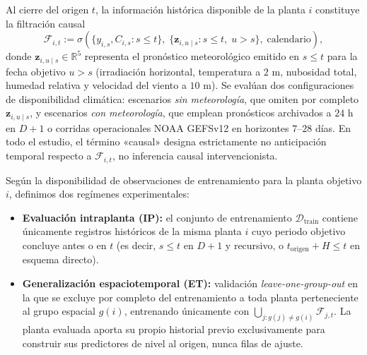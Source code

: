 Al cierre del origen $t$, la información histórica disponible de la planta $i$ constituye la filtración causal
\begin{equation}
\mathcal{F}_{i,t} := \sigma\!\left(\{y_{i,s}, C_{i,s} : s \le t\},\; \{\mathbf{z}_{i,u \mid s} : s \le t,\; u > s\},\; \text{calendario}\right),
\end{equation}
donde $\mathbf{z}_{i,u \mid s} \in \mathbb{R}^5$ representa el pronóstico meteorológico emitido en $s \le t$ para la fecha objetivo $u > s$ (irradiación horizontal, temperatura a $2\text{ m}$, nubosidad total, humedad relativa y velocidad del viento a $10\text{ m}$). Se evalúan dos configuraciones de disponibilidad climática: escenarios \emph{sin meteorología}, que omiten por completo $\mathbf{z}_{i,u \mid s}$, y escenarios \emph{con meteorología}, que emplean pronósticos archivados a $24\text{ h}$ en $D+1$ o corridas operacionales NOAA GEFSv12 en horizontes $7$--$28$ días. En todo el estudio, el término «causal» designa estrictamente no anticipación temporal respecto a $\mathcal{F}_{i,t}$, no inferencia causal intervencionista.

Según la disponibilidad de observaciones de entrenamiento para la planta objetivo $i$, definimos dos regímenes experimentales:
\begin{itemize}
    \item \textbf{Evaluación intraplanta (IP):} el conjunto de entrenamiento $\mathcal{D}_{\mathrm{train}}$ contiene únicamente registros históricos de la misma planta $i$ cuyo periodo objetivo concluye antes o en $t$ (es decir, $s \le t$ en $D+1$ y recursivo, o $t_{\mathrm{origen}} + H \le t$ en esquema directo).
    \item \textbf{Generalización espaciotemporal (ET):} validación \textit{leave-one-group-out} en la que se excluye por completo del entrenamiento a toda planta perteneciente al grupo espacial $g(i)$, entrenando únicamente con $\bigcup_{j : g(j) \ne g(i)} \mathcal{F}_{j,t}$. La planta evaluada aporta su propio historial previo exclusivamente para construir sus predictores de nivel al origen, nunca filas de ajuste.
\end{itemize}

